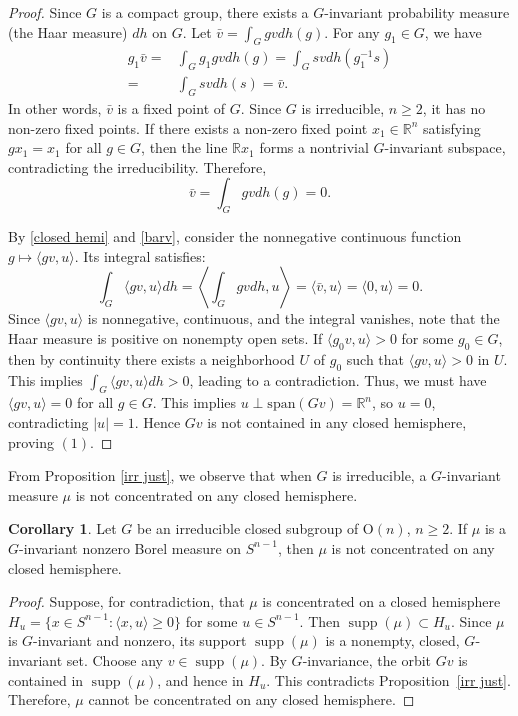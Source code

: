 \documentclass[12pt, reqno]{amsart}
\theoremstyle{definition}
\newtheorem{corollary}[theorem]{Corollary}
\theoremstyle{remark}
\numberwithin{equation}{section}
\newcommand{\Sn}{S^{n-1}}
\newcommand{\On}{\mathrm{O}(n)}
\begin{document}
\begin{proof}
		 Since $G$ is a compact group, there exists a $G$-invariant probability measure (the Haar measure) $dh$ on $G$.  Let $\bar{v}=\int_G gv dh(g)$. For any $g_{1}\in G$, we have
		 \begin{align*}
		 	g_{1}\bar{v}=&\int_G g_{1}gv dh(g) =\int_G sv dh(g_{1}^{-1}s)\\
		 	=&\int_G sv dh(s)=\bar{v}.
		 \end{align*}
		 In other words, $\bar{v}$ is a fixed point of $G$. 	Since $G$ is irreducible, $n\ge 2$, it has no non-zero fixed points. If there exists a non-zero fixed point $x_1 \in \mathbb{R}^n$ satisfying $gx_1 = x_1$ for all $g \in G$, then the line $\mathbb{R}x_1$ forms a nontrivial $G$-invariant subspace, contradicting the irreducibility. Therefore, 
		 \begin{equation} \label{barv} 
		 	\bar{v}=\int_G gv dh(g)=0.
		 \end{equation}
		 
		 
		By \eqref{closed hemi} and \eqref{barv},     consider the nonnegative continuous function $g \mapsto \langle g  v, u \rangle$. Its integral satisfies:
	\[
	\int_G \langle g  v, u \rangle  dh = \left\langle \int_G g  v  dh, u \right\rangle =\langle \bar{v}, u \rangle = \langle 0, u \rangle = 0.
	\]
		Since $\langle g  v, u \rangle$ is nonnegative, continuous, and the integral vanishes, note that the Haar measure is positive on nonempty open sets. If $\langle g_{0}  v, u \rangle>0$ for some $g_{0}\in G$, then by continuity there exists a neighborhood $U$ of $g_{0}$ such that $\langle g  v, u \rangle>0$ in $U$. This implies $	\int_G \langle g  v, u \rangle  dh >0$,  leading to a contradiction. Thus,  we must have $\langle g  v, u \rangle = 0$ for all $g \in G$. This implies $u \perp \text{span}(Gv) = \mathbb{R}^n$, so $u = 0$, contradicting $|u| = 1$. Hence $Gv$ is not contained in any closed hemisphere, proving $(1)$.
		
	\end{proof}
	
	
		From Proposition \ref{irr just}, we observe that when $G$ is irreducible, a $G$-invariant measure $\mu$ is  not concentrated
	on any closed hemisphere.
	
	\begin{corollary}
		Let $G$ be an irreducible closed subgroup of $\On$, $n\ge2$.  If $\mu$ is a $G$-invariant nonzero Borel measure on $\Sn$, then $\mu$ is  not concentrated
		on any closed hemisphere.
	\end{corollary}
	
	\begin{proof}
		Suppose, for contradiction, that $\mu$ is concentrated on a  closed hemisphere $H_u=\{x\in\Sn: \langle x,u \rangle\ge0\}$ for some $u\in\Sn$. Then $\operatorname{supp}(\mu) \subset H_u$.
		Since $\mu$ is $G$-invariant and nonzero, its support $\operatorname{supp}(\mu)$ is a nonempty, closed, $G$-invariant set. Choose any $v \in \operatorname{supp}(\mu)$. By $G$-invariance, the orbit $Gv$ is contained in $\operatorname{supp}(\mu)$, and hence in $H_u$.
		This contradicts Proposition~\ref{irr just}. Therefore, $\mu$ cannot be concentrated on any closed hemisphere.
	\end{proof}
	
\end{document}
